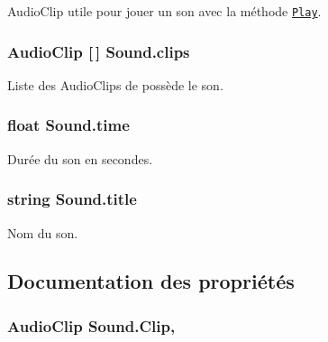 Audio\+Clip utile pour jouer un son avec la méthode \href{http://docs.unity3d.com/ScriptReference/AudioSource.Play.html}{\tt Play}. 

\hypertarget{class_sound_a47365930606d69c51ad013120d4df151}{}
\subsubsection[{clips}]{\setlength{\rightskip}{0pt plus 5cm}Audio\+Clip \mbox{[}$\,$\mbox{]} Sound.\+clips}\label{class_sound_a47365930606d69c51ad013120d4df151}


Liste des Audio\+Clips de possède le son. 

\hypertarget{class_sound_a2b67e874a75d0d390d37cdbaa2f51087}{}
\subsubsection[{time}]{\setlength{\rightskip}{0pt plus 5cm}float Sound.\+time\hspace{0.3cm}{\ttfamily [private]}}\label{class_sound_a2b67e874a75d0d390d37cdbaa2f51087}


Durée du son en secondes. 

\hypertarget{class_sound_a17853cdf74f081a79ba4e658c6e25a13}{}
\subsubsection[{title}]{\setlength{\rightskip}{0pt plus 5cm}string Sound.\+title\hspace{0.3cm}{\ttfamily [private]}}\label{class_sound_a17853cdf74f081a79ba4e658c6e25a13}


Nom du son. 



\subsection{Documentation des propriétés}
\hypertarget{class_sound_a607ab2942d9e326299b6f5b4302b4b35}{}
\subsubsection[{Clip}]{\setlength{\rightskip}{0pt plus 5cm}Audio\+Clip Sound.\+Clip\hspace{0.3cm}{\ttfamily [get]}, {\ttfamily [set]}}\label{class_sound_a607ab2942d9e326299b6f5b4302b4b35}
\hypertarget{class_sound_ada3b25bf02b92b6d0190ad5541b3e4d8}{}
